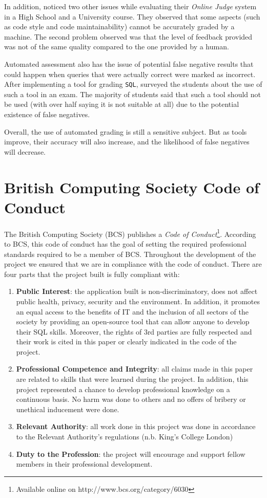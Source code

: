 In addition, \cite{literature:assesment:automated:brenda} noticed two other issues while evaluating their \textit{Online Judge} system in a High School and a University course. They observed that some aspects (such as code style and code maintainability) cannot be accurately graded by a machine. The second problem observed was that the level of feedback provided was not of the same quality compared to the one provided by a human.

Automated assessment also has the issue of potential false negative results that could happen when queries that were actually correct were marked as incorrect. After implementing a tool for grading \texttt{SQL}, \cite{literature:asqlg} surveyed the students about the use of such a tool in an exam. The majority of students said that such a tool should not be used (with over half saying it is not suitable at all) due to the potential existence of false negatives.

Overall, the use of automated grading is still a sensitive subject. But as tools improve, their accuracy will also increase, and the likelihood of false negatives will decrease.

\section{British Computing Society Code of Conduct}

The British Computing Society (BCS) publishes a \textit{Code of Conduct}\footnote{Available online on http://www.bcs.org/category/6030}. According to BCS, this code of conduct has the goal of setting the required professional standards required to be a member of BCS. Throughout the development of the project we ensured that we are in compliance with the code of conduct. There are four parts that the project built is fully compliant with:

\begin{enumerate}
    \item \textbf{Public Interest}: the application built is non-discriminatory, does not affect public health, privacy, security and the environment. In addition, it promotes an equal access to the benefits of IT and the inclusion of all sectors of the society by providing an open-source tool that can allow anyone to develop their SQL skills. Moreover, the rights of 3rd parties are fully respected and their work is cited in this paper or clearly indicated in the code of the project.
    \item \textbf{Professional Competence and Integrity}: all claims made in this paper are related to skills that were learned during the project. In addition, this project represented a chance to develop professional knowledge on a continuous basis. No harm was done to others and no offers of bribery or unethical inducement were done.
    \item \textbf{Relevant Authority}: all work done in this project was done in accordance to the Relevant Authority's regulations (n.b. King's College London)
    \item \textbf{Duty to the Profession}: the project will encourage and support fellow members in their professional development.
\end{enumerate}

